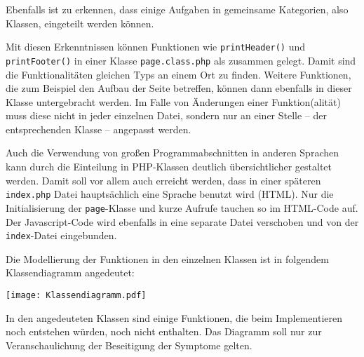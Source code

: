 \documentclass{scrartcl}
\begin{document}
Ebenfalls ist zu erkennen, dass einige Aufgaben in gemeinsame Kategorien, also Klassen, eingeteilt werden können. 

Mit diesen Erkenntnissen können Funktionen wie \lstinline`printHeader()` und \lstinline`printFooter()` in einer Klasse \lstinline`page.class.php` als zusammen gelegt. Damit sind die Funktionalitäten gleichen Typs an einem Ort zu finden. Weitere Funktionen, die zum Beispiel den Aufbau der Seite betreffen, können dann ebenfalls in dieser Klasse untergebracht werden. Im Falle von Änderungen einer Funktion(alität) muss diese nicht in jeder einzelnen Datei, sondern nur an einer Stelle -- der entsprechenden Klasse -- angepasst werden.

Auch die Verwendung von großen Programmabschnitten in anderen Sprachen kann durch die Einteilung in PHP-Klassen deutlich übersichtlicher gestaltet werden. Damit soll vor allem auch erreicht werden, dass in einer späteren \lstinline`index.php` Datei hauptsächlich eine Sprache benutzt wird (HTML). Nur die Initialisierung der \lstinline`page`-Klasse und kurze Aufrufe tauchen so im HTML-Code auf. Der Javascript-Code wird ebenfalls in eine separate Datei verschoben und von der \lstinline`index`-Datei eingebunden.

Die Modellierung der Funktionen in den einzelnen Klassen ist in folgendem Klassendiagramm angedeutet:
\begin{center}
\texttt{[image: Klassendiagramm.pdf]}
\end{center}
In den angedeuteten Klassen sind einige Funktionen, die beim Implementieren noch entstehen würden, noch nicht enthalten. Das Diagramm soll nur zur Veranschaulichung der Beseitigung der Symptome gelten.\bigskip
\end{document}
